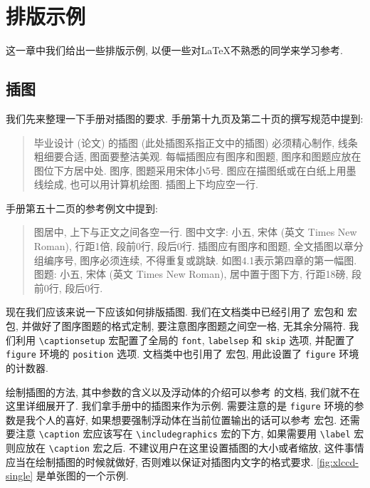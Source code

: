 
\section{排版示例}

这一章中我们给出一些排版示例, 以便一些对\LaTeX 不熟悉的同学来学习参考.

\subsection{插图}

我们先来整理一下手册对插图的要求. 手册第十九页及第二十页的撰写规范中提到:
\begin{quote}
  毕业设计 (论文) 的插图 (此处插图系指正文中的插图) 必须精心制作, 线条粗细要合适, 图面要整洁美观. 每幅插图应有图序和图题, 图序和图题应放在图位下方居中处. 图序, 图题采用宋体小5号. 图应在描图纸或在白纸上用墨线绘成, 也可以用计算机绘图. 插图上下均应空一行.
\end{quote}
手册第五十二页的参考例文中提到:
\begin{quote}
  图居中, 上下与正文之间各空一行.
  图中文字: 小五, 宋体 (英文 Times New Roman), 行距1倍, 段前0行, 段后0行.
  插图应有图序和图题, 全文插图以章分组编序号, 图序必须连续, 不得重复或跳缺. 如图4.1表示第四章的第一幅图.
  图题: 小五, 宋体 (英文 Times New Roman), 居中置于图下方, 行距18磅, 段前0行, 段后0行.
\end{quote}

现在我们应该来说一下应该如何排版插图. 我们在文档类中已经引用了  宏包\footnotemark 和  宏包, 并做好了图序图题的格式定制, 要注意图序图题之间空一格, 无其余分隔符. 我们利用 \verb|\captionsetup| 宏配置了全局的 \verb|font|, \verb|labelsep| 和 \verb|skip| 选项, 并配置了 \verb|figure| 环境的 \verb|position| 选项. 文档类中也引用了  宏包, 用此设置了 \verb|figure| 环境的计数器.

绘制插图的方法, 其中参数的含义以及浮动体的介绍可以参考  的文档, 我们就不在这里详细展开了. 我们拿手册中的插图来作为示例. 需要注意的是 \verb|figure| 环境的参数是我个人的喜好, 如果想要强制浮动体在当前位置输出的话可以参考  宏包. 还需要注意 \verb|\caption| 宏应该写在 \verb|\includegraphics| 宏的下方, 如果需要用 \verb|\label| 宏则应放在 \verb|\caption| 宏之后. 不建议用户在这里设置插图的大小或者缩放, 这件事情应当在绘制插图的时候就做好, 否则难以保证对插图内文字的格式要求. \ref{fig:xlccd-single} 是单张图的一个示例.

